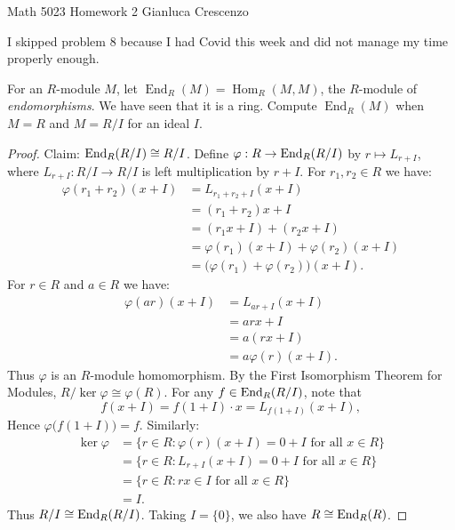 \documentclass[10pt,oneside,openany]{memoir}
\begin{document}
\homeworktitle
{Math 5023} %
{Homework 2} %
{Gianluca Crescenzo} %


{\color{red} I skipped problem 8 because I had Covid this week and did not manage my time properly enough.}



\begin{exercise}
For an $R$-module $M$, let
$\operatorname{End}_R(M)=\operatorname{Hom}_R(M,M)$, the $R$-module of
\textit{endomorphisms}. We have seen that it is a ring. Compute
$\operatorname{End}_R(M)$ when $M=R$ and $M=R/I$ for an ideal $I$.
\end{exercise}
	{\color{blue} \begin{proof}
Claim: $\operatorname{End}_R(R/I) \cong R/I$. Define $\varphi:R \rightarrow \operatorname{End}_R(R/I)$ by $r \mapsto L_{r+I}$, where $L_{r+I}:R/I \rightarrow R/I$ is left multiplication by $r+I$. For $r_1,r_2 \in R$ we have:
\begin{align*}
	\varphi(r_1 + r_2)(x+I)
	&= L_{r_1+r_2+I}(x+I) \\
	&= (r_1+r_2)x+I \\
	&= (r_1x+I)+(r_2x+I) \\
	&= \varphi(r_1)(x+I)+\varphi(r_2)(x+I) \\
	&= \bigl(\varphi(r_1)+\varphi(r_2)\bigr)(x+I).
\end{align*}
For $r \in R$ and $a \in R$ we have:
\begin{align*}
	\varphi(ar)(x+I)
	&= L_{ar+I}(x+I) \\
	&= arx+I \\
	&= a(rx+I) \\
	&= a\varphi(r)(x+I).
\end{align*}
Thus $\varphi$ is an $R$-module homomorphism. By the First Isomorphism Theorem for Modules, $R/\ker\varphi \cong \varphi(R)$. For any $f \in \operatorname{End}_R(R/I)$, note that
\[
f(x+I)=f(1+I)\cdot x=L_{f(1+I)}(x+I),
\]
Hence $\varphi\bigl(f(1+I)\bigr)=f$. Similarly:
\begin{align*}
	\ker\varphi
	&= \{r\in R:\varphi(r)(x+I)=0+I \text{ for all }x\in R\} \\
	&= \{r\in R:L_{r+I}(x+I)=0+I \text{ for all }x\in R\} \\
	&= \{r\in R:rx\in I \text{ for all }x\in R\} \\
	&= I.
\end{align*}
Thus $R/I\cong\operatorname{End}_R(R/I)$. Taking $I = \{0\}$, we also have $R \cong \operatorname{End}_R(R)$.
	\end{proof}}
\end{document}
